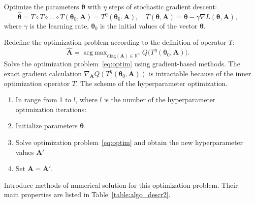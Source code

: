 \documentclass[smallextended]{svjour3}
\DeclareMathOperator*{\argmax}{arg\,max}
\begin{document}
Optimize the parameters  $\boldsymbol{\theta}$ with $\eta$ steps of stochastic gradient descent:
\begin{equation}
\label{eq:gd}
	 \hat{\boldsymbol{\theta}} = T \circ T \circ \dots \circ T(\boldsymbol{\theta}_0, \mathbf{A}) = T^\eta(\boldsymbol{\theta}_0, \mathbf{A}), \quad 	T(\boldsymbol{\theta}, \mathbf{A}) =\boldsymbol{\theta} - \gamma \nabla L(\boldsymbol{\theta}, \mathbf{A}), 
\end{equation}
where $\gamma$ is the learning rate, $\boldsymbol{\theta}_0$ is the initial values of the vector $\boldsymbol{\theta}$. 

Redefine the optimization problem according to the definition of operator $T$:
\begin{equation}
\label{eq:optim}
	\hat{\mathbf{A}} = \argmax_{\text{diag}(\mathbf{A}) \in \mathbb{R}^n} Q\bigl( T^\eta(\boldsymbol{\theta}_0, \mathbf{A})\bigr).
\end{equation}
Solve the optimization problem~\eqref{eq:optim} using gradient-based methods. The exact gradient calculation $\nabla_{\mathbf{A}} Q( T^\eta(\boldsymbol{\theta}_0, \mathbf{A}))$ is intractable because of the inner optimization operator $T$. The scheme of the hyperparameter optimization.
\begin{enumerate}
\item In range from 1 to  $l$, where $l$ is the number of the hyperparameter optimization iterations:
\item Initialize parameters $\boldsymbol{\theta}$.
\item Solve optimization problem~\eqref{eq:optim} and obtain the new hyperparameter values $\mathbf{A}'$
\item Set $\mathbf{A} = \mathbf{A}'$.
\end{enumerate}

Introduce methods of numerical solution for this optimization problem. Their main properties are listed in Table~\ref{table:algo_descr2}.
\end{document}
